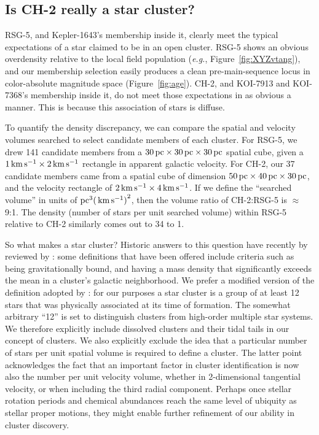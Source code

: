 \documentclass[12pt,twocolumn,linenumbers]{aastex63}
\newcommand{\mkms}{{\rm \,km\,s^{-1}}}  %
\begin{document}
\subsection{Is CH-2 really a star cluster?}

RSG-5, and Kepler-1643's membership inside it, clearly meet the
typical expectations of a star claimed to be in an open cluster.
RSG-5 shows an obvious overdensity relative to the local field
population ({\it e.g.}, Figure~\ref{fig:XYZvtang}), and our membership
selection easily produces a clean pre-main-sequence locus in 
color-absolute magnitude space (Figure~\ref{fig:age}).
CH-2, and KOI-7913 and KOI-7368's membership inside it, do not meet
those expectations in as obvious a manner.  This is because this
association of stars is diffuse.

To quantify the density discrepancy, we can compare the spatial and
velocity volumes searched to select candidate members of each cluster.
For RSG-5, we drew 141 candidate members from a $30\,{\rm
pc}\times30\,{\rm pc}\times30\,{\rm pc}$ spatial cube, given a $1 {\rm \mkms} \times 2 {\rm \mkms }$ rectangle in apparent galactic velocity.
For CH-2, our 37 candidate members came from a spatial cube of
dimension $50\,{\rm pc}\times40\,{\rm pc}\times30\,{\rm pc}$, and the
velocity rectangle of $2 {\rm \mkms} \times 4 {\rm \mkms}$.  If we
define the ``searched volume'' in units of ${\rm pc}^3 {\rm
(\mkms)}^2$, then the volume ratio of CH-2:RSG-5 is $\approx$9:1.  The
density (number of stars per unit searched volume) within RSG-5 relative to
CH-2 similarly comes out to 34 to 1.

So what makes a star cluster?  Historic answers to this question have
recently by reviewed by \citet{krumholz_star_2019}: some definitions
that have been offered include criteria such as being gravitationally
bound, and having a mass density that significantly exceeds the mean
in a cluster's galactic neighborhood.  We prefer a modified version of
the definition adopted by \citet{krumholz_star_2019}: for our purposes
a star cluster is a group of at least 12 stars that was physically
associated at its time of formation.  The somewhat arbitrary ``12'' is
set to distinguish clusters from high-order multiple star systems.  We
therefore explicitly include dissolved clusters and their tidal tails
in our concept of clusters.  We also explicitly exclude the idea that
a particular number of stars per unit spatial volume is required to
define a cluster.  The latter point acknowledges the fact that an
important factor in cluster identification is now also the number per
unit velocity volume, whether in 2-dimensional tangential velocity, or
when including the third radial component.  Perhaps
once stellar rotation periods and chemical abundances reach the same
level of ubiquity as stellar proper motions, they might enable further
refinement of our ability in cluster discovery.
\end{document}
